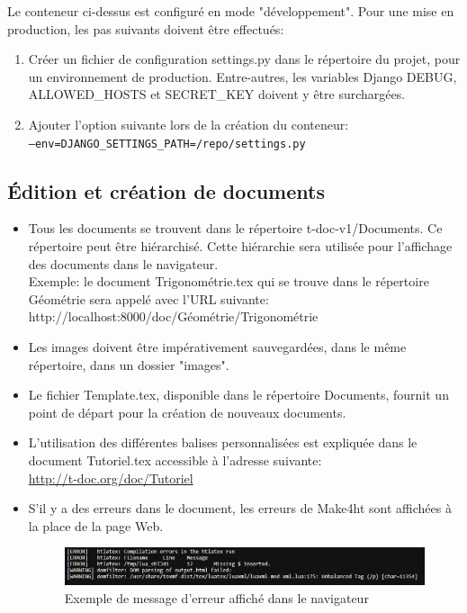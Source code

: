 \documentclass[12pt,titlepage,oneside]{article}
\begin{document}
\newpage
Le conteneur ci-dessus est configuré en mode "développement". Pour une mise en production, les pas suivants doivent être effectués:
\begin{enumerate}
  \item Créer un fichier de configuration settings.py dans le répertoire du projet, pour un environnement de production. Entre-autres, les variables Django DEBUG, ALLOWED\_HOSTS et SECRET\_KEY doivent y être surchargées.
  \item Ajouter l'option suivante lors de la création du conteneur:\\
  \texttt{--env=DJANGO\_SETTINGS\_PATH=/repo/settings.py}
\end{enumerate}

\subsection{Édition et création de documents}
\begin{itemize}
\item Tous les documents se trouvent dans le répertoire t-doc-v1/Documents. Ce répertoire peut être hiérarchisé. Cette hiérarchie sera utilisée pour l'affichage des documents dans le navigateur.\\
Exemple: le document Trigonométrie.tex qui se trouve dans le répertoire Géométrie sera appelé avec l'URL suivante:\\
http://localhost:8000/doc/Géométrie/Trigonométrie\par

\item Les images doivent être impérativement sauvegardées, dans le même répertoire, dans un dossier "images".\par

\item Le fichier Template.tex, disponible dans le répertoire Documents, fournit un point de départ pour la création de nouveaux documents.\par

\item L'utilisation des différentes balises personnalisées est expliquée dans le document Tutoriel.tex accessible à l'adresse suivante:\\
\url{http://t-doc.org/doc/Tutoriel}\par

\item S'il y a des erreurs dans le document, les erreurs de Make4ht sont affichées à la place de la page Web.
\begin{figure}[H]
\centering
\includegraphics[width=1\textwidth]{images/Erreur.png}\caption{Exemple de message d'erreur affiché dans le navigateur}
\end{figure}
\end{itemize}
\end{document}
